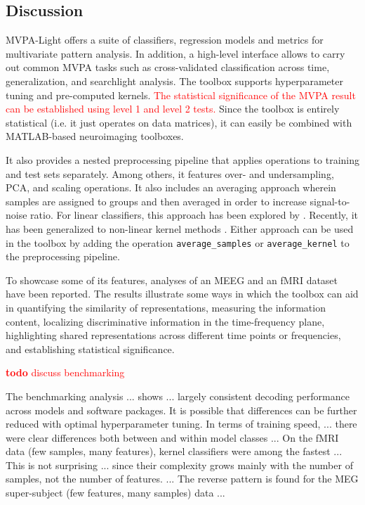 \documentclass[utf8]{frontiersSCNS} %
\newcommand{\ttt}[1]{\texttt{#1}}
\newcommand{\red}[1]{\textcolor{red}{#1}}
\newcommand{\todo}[1]{\textcolor{red}{\textbf{todo} #1}}
\begin{document}
\subsection{Discussion}

MVPA-Light offers a suite of classifiers, regression models and metrics for multivariate pattern analysis. In addition, a high-level interface allows to carry out common MVPA tasks such as cross-validated classification across time,  generalization, and searchlight analysis. The toolbox supports hyperparameter tuning and pre-computed kernels. \red{The statistical significance of the MVPA result can be established using level 1 and level 2 tests.} Since the toolbox is entirely statistical (i.e. it just operates on data matrices), it can easily be combined with MATLAB-based neuroimaging toolboxes. 

It also provides a nested preprocessing pipeline that applies operations to training and test sets separately. Among others, it features over- and undersampling, PCA, and scaling operations. It also includes an averaging approach wherein samples are assigned to groups and then averaged in order to increase signal-to-noise ratio. For linear classifiers, this approach has been explored by \citep{Cichy2015,Cichy2017MultivariateSpace}. Recently, it has been generalized to non-linear kernel methods \citep{Treder2018}. Either approach can be used in the toolbox by adding the operation \ttt{average\_samples} or \ttt{average\_kernel} to the preprocessing pipeline. 

To showcase some of its features, analyses of an MEEG \citep{Wakeman2015ADataset} and an fMRI \citep{Haxby2001} dataset have been reported. The results illustrate some ways in which the toolbox can aid in quantifying the similarity of representations, measuring the information content, localizing discriminative information in the time-frequency plane, highlighting shared representations across different time points or frequencies, and establishing statistical significance.

\todo{discuss benchmarking}




The benchmarking analysis ... shows ... largely consistent decoding performance across models and software packages. It is possible that differences can be further reduced with optimal hyperparameter tuning. In terms of training speed, ... there were clear differences both between and within model classes ... On the fMRI data (few samples, many features), kernel classifiers were among the fastest ... This is not surprising ... since their complexity grows mainly with the number of samples, not the number of features. ... The reverse pattern is found for the MEG super-subject (few features, many samples) data ...
\end{document}

